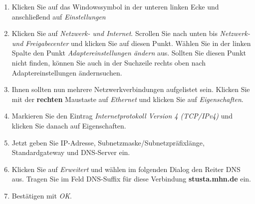 \documentclass[a4paper,12pt]{scrartcl}
\begin{document}
\begin{minipage}{0.57\textwidth}
\begin{enumerate}
	\item Klicken Sie auf das Windowssymbol in der unteren linken Ecke und anschließend auf \emph{Einstellungen}
	\item Klicken Sie auf \textit{Netzwerk- und Internet}.
	Scrollen Sie nach unten bis \textit{Netzwerk- und Freigabecenter} und klicken Sie auf diesen Punkt. Wählen Sie in der linken Spalte den Punkt \textit{Adaptereinstellungen ändern} aus.
	Sollten Sie diesen Punkt nicht finden, können Sie auch in der Suchzeile rechts oben nach \glqq Adaptereinstellungen ändern\grqq suchen.

    \item Ihnen sollten nun mehrere Netzwerkverbindungen aufgelistet sein. Klicken Sie mit der \textbf{rechten} Maustaste auf \textit{Ethernet} und klicken Sie auf \textit{Eigenschaften}.
    \item Markieren Sie den Eintrag \textit{Internetprotokoll Version 4 (TCP/IPv4)} und klicken Sie danach auf Eigenschaften.
    \item Jetzt geben Sie IP-Adresse, Subnetzmaske/Subnetzpräfixlänge, Standardgateway und DNS-Server ein.
    \item Klicken Sie auf \textit{Erweitert} und wählen im folgenden Dialog den Reiter DNS aus. Tragen Sie im Feld DNS-Suffix für diese Verbindung \textbf{stusta.mhn.de} ein.
    \item Bestätigen mit \textit{OK}.
\end{enumerate}
\end{minipage}
\hfill
\end{document}
